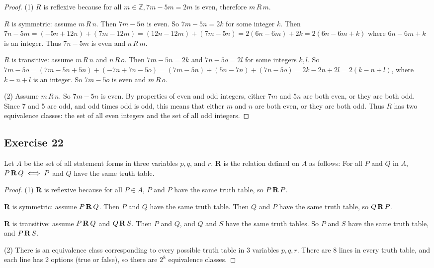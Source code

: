 \documentclass[14pt]{extarticle}
\newcommand{\Z}{\mathbb{Z}}
\begin{document}
\begin{proof}
        (1) \(R\) is reflexive because for all \(m \in \Z, 7m - 5m = 2m\) is even, therefore \(m \, R \, m\).

        \(R\) is symmetric: assume \(m \,R\, n\). Then \(7m - 5n\) is even. So \(7m-5n=2k\) for some integer $k$. Then
        \(7n-5m = (-5n+12n) + (7m-12m) = (12n-12m) + (7m-5n) = 2(6n-6m) + 2k = 2(6n-6m+k)\) where \(6n-6m+k\) is an
        integer. Thus \(7n-5m\) is even and \(n \,R\, m\).

        \(R\) is transitive: assume \(m \,R\, n\) and \(n \,R\, o\). Then \(7m-5n=2k\) and \(7n-5o=2l\) for some integers
        \(k, l\). So \(7m-5o = (7m-5n+5n) + (-7n+7n-5o) = (7m-5n) + (5n-7n) + (7n-5o) = 2k - 2n + 2l = 2(k-n+l)\), where
        \(k-n+l\) is an integer. So \(7m-5o\) is even and \(m \,R\, o\).

        (2) Assume \(m \,R\, n\). So \(7m-5n\) is even. By properties of even and odd integers, either \(7m\) and
        \(5n\) are both even, or they are both odd. Since 7 and 5 are odd, and odd times odd is odd, this means that either
        $m$ and $n$ are both even, or they are both odd. Thus $R$ has two equivalence classes: the set of all even integers
        and the set of all odd integers.
\end{proof}

\subsection{Exercise 22}
Let \(A\) be the set of all statement forms in three variables \(p, q\), and \(r\). {\bf R} is the relation
defined on \(A\) as follows: For all \(P\) and \(Q\) in \(A\), \(P \,{\bf R}\, Q \iff P\) and \(Q\) have the same
truth table.

\begin{proof}
        (1) {\bf R} is reflexive because for all \(P \in A\), \(P\) and \(P\) have the same truth table, so \(P\,{\bf R}\, P\).

                {\bf R} is symmetric: assume \(P \,{\bf R}\, Q\). Then \(P\) and \(Q\) have the same truth table. Then \(Q\) and
        \(P\) have the same truth table, so \(Q \,{\bf R}\, P\).

                {\bf R} is transitive: assume \(P \,{\bf R}\, Q\) and \(Q \,{\bf R}\, S\). Then \(P\) and \(Q\), and \(Q\) and \(S\)
        have the same truth tables. So \(P\) and \(S\) have the same truth table, and \(P \,{\bf R}\, S\).

        (2) There is an equivalence class corresponding to every possible truth table in 3 variables $p,q,r$. There are 8
        lines in every truth table, and each line has 2 options (true or false), so there are \(2^8\) equivalence classes.
\end{proof}
\end{document}
